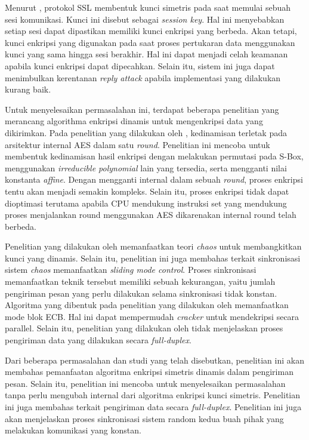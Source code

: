 Menurut \textcite{munir2019}, protokol SSL membentuk kunci simetris pada saat memulai sebuah sesi komunikasi. Kunci ini disebut sebagai \emph{session key}. Hal ini menyebabkan setiap sesi dapat dipastikan memiliki kunci enkripsi yang berbeda. Akan tetapi, kunci enkripsi yang digunakan pada saat proses pertukaran data menggunakan kunci yang sama hingga sesi berakhir. Hal ini dapat menjadi celah keamanan apabila kunci enkripsi dapat dipecahkan. Selain itu, sistem ini juga dapat menimbulkan kerentanan \emph{reply attack} apabila implementasi yang dilakukan kurang baik.

Untuk menyelesaikan permasalahan ini, terdapat beberapa penelitian yang merancang algorithma enkripsi dinamis untuk mengenkripsi data yang dikirimkan. Pada penelitian yang dilakukan oleh \textcite{singh2019}, kedinamisan terletak pada arsitektur internal AES dalam satu \emph{round}. Penelitian ini mencoba untuk membentuk kedinamisan hasil enkripsi dengan melakukan permutasi pada S-Box, menggunakan \emph{irreducible polynomial} lain yang tersedia, serta mengganti nilai konstanta \emph{affine}. Dengan mengganti internal dalam sebuah \emph{round}, proses enkripsi tentu akan menjadi semakin kompleks. Selain itu, proses enkripsi tidak dapat dioptimasi terutama apabila CPU mendukung instruksi set yang mendukung proses menjalankan round menggunakan AES dikarenakan internal round telah berbeda.

Penelitian yang dilakukan oleh \textcite{lin2021} memanfaatkan teori \emph{chaos} untuk membangkitkan kunci yang dinamis. Selain itu, penelitian ini juga membahas terkait sinkronisasi sistem \emph{chaos} memanfaatkan \emph{sliding mode control}. Proses sinkronisasi memanfaatkan teknik tersebut memiliki sebuah kekurangan, yaitu jumlah pengiriman pesan yang perlu dilakukan selama sinkronisasi tidak konstan. Algoritma yang dibentuk pada penelitian yang dilakukan oleh \textcite{lin2021} memanfaatkan mode blok ECB. Hal ini dapat mempermudah \emph{cracker} untuk mendekripsi secara parallel. Selain itu, penelitian yang dilakukan oleh \textcite{lin2021} tidak menjelaskan proses pengiriman data yang dilakukan secara \emph{full-duplex}.

Dari beberapa permasalahan dan studi yang telah disebutkan, penelitian ini akan membahas pemanfaatan algoritma enkripsi simetris dinamis dalam pengiriman pesan. Selain itu, penelitian ini mencoba untuk menyelesaikan permasalahan tanpa perlu mengubah internal dari algoritma enkripsi kunci simetris. Penelitian ini juga membahas terkait pengiriman data secara \emph{full-duplex}. Penelitian ini juga akan menjelaskan proses sinkronisasi sistem random kedua buah pihak yang melakukan komunikasi yang konstan.

